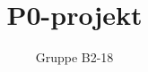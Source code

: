 \documentclass{article}
\begin{document}
	\title{P0-projekt}
	\author{Gruppe B2-18}
	\maketitle
	
\end{document}
